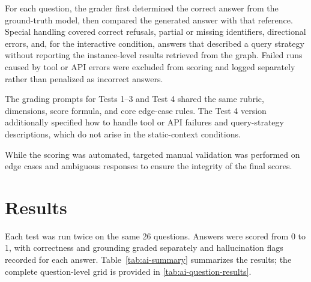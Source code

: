 For each question, the grader first determined the correct answer from the ground-truth model, then compared the generated answer with that reference. Special handling covered correct refusals, partial or missing identifiers, directional errors, and, for the interactive condition, answers that described a query strategy without reporting the instance-level results retrieved from the graph. Failed runs caused by tool or API errors were excluded from scoring and logged separately rather than penalized as incorrect answers.

The grading prompts for Tests 1--3 and Test 4 shared the same rubric, dimensions, score formula, and core edge-case rules. The Test 4 version additionally specified how to handle tool or API failures and query-strategy descriptions, which do not arise in the static-context conditions.

While the scoring was automated, targeted manual validation was performed on edge cases and ambiguous responses to ensure the integrity of the final scores.

\section{Results}
\label{sec:ai-results}

Each test was run twice on the same 26 questions. Answers were scored from 0 to 1, with correctness and grounding graded separately and hallucination flags recorded for each answer. Table~\ref{tab:ai-summary} summarizes the results; the complete question-level grid is provided in \autoref{tab:ai-question-results}.

\begin{table}[H]
\centering
\caption{Summary of the LLM evaluation results}
\label{tab:ai-summary}
\small
{}
\end{table}


